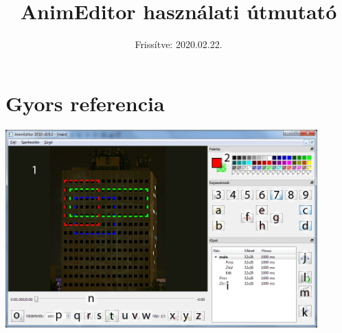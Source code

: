 \documentclass[a4paper,12pt,release]{article}
\title{AnimEditor használati útmutató}
\date{Frissítve: 2020.02.22.}
\begin{document}
\maketitle
\newpage
\tableofcontents
\clearpage
\section{Gyors referencia}
\includegraphics[width=0.9\textwidth]{pics/main.jpg}\\
\end{document}
